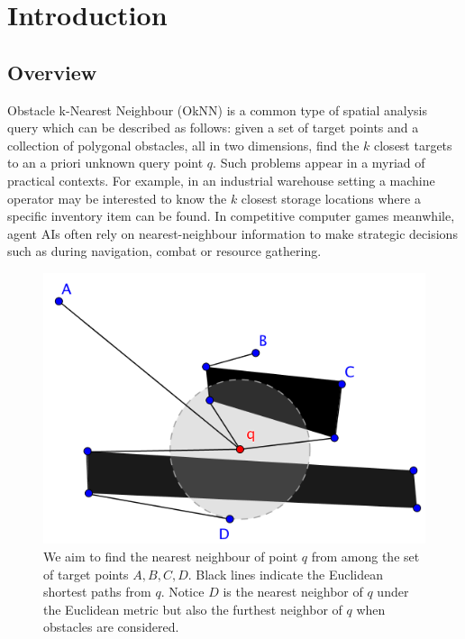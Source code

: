 \chapter{Introduction}
\section{Overview}

Obstacle k-Nearest Neighbour (OkNN) is a common type of spatial analysis query 
which can be described as follows: given a set of target points and a 
collection of polygonal obstacles, all in two dimensions, find the $k$ 
closest targets to an a priori unknown query point $q$.
Such problems appear in a myriad of practical contexts.
For example, in an industrial warehouse setting a machine operator may be
interested to know the $k$ closest storage locations where a specific 
inventory item can be found. In competitive computer games meanwhile, agent 
AIs often rely on nearest-neighbour information to make strategic decisions 
such as during navigation, combat or resource gathering.

\begin{figure}[htp]
  \centering
  \includegraphics[width=\linewidth]{./pic/obs_dis.png}
  \caption{\small
  We aim to find the nearest neighbour of point $q$ from among the set of target points $A,B,C,D$. Black lines indicate the Euclidean shortest paths from $q$. Notice $D$ is the nearest neighbor of $q$ under the Euclidean metric but also the furthest neighbor of $q$ when obstacles are considered.}
\label{obs_dis}
\end{figure}

